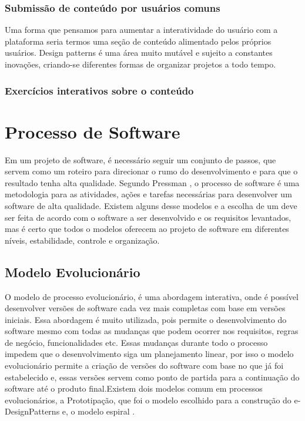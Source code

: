 \subsubsection{Submissão de conteúdo por usuários comuns}
Uma forma que pensamos para aumentar a interatividade do usuário com a plataforma seria termos uma seção de conteúdo alimentado pelos próprios usuários. Design patterns é uma área muito mutável e sujeito a constantes inovações, criando-se diferentes formas de organizar projetos a todo tempo. 
\subsubsection{Exercícios interativos sobre o conteúdo}

\section{Processo de Software}

Em um projeto de software, é necessário seguir um conjunto de passos, que servem como um roteiro para direcionar o rumo do desenvolvimento e para que o resultado tenha alta qualidade. Segundo Pressman \cite{pressman2016engenharia}, o processo de software é uma metodologia para as atividades, ações e tarefas necessárias para desenvolver um software de alta qualidade. Existem alguns desse modelos e a escolha de um deve ser feita de acordo com o software a ser desenvolvido e os requisitos levantados, mas é certo que todos o modelos oferecem ao projeto de software em diferentes níveis, estabilidade, controle e organização.

\subsection{Modelo Evolucionário} 

O modelo de processo evolucionário, é uma abordagem interativa, onde é possível desenvolver versões de software cada vez mais completas com base em versões iniciais. Essa abordagem é muito utilizada, pois permite o desenvolvimento do software  mesmo com todas as mudanças que podem ocorrer nos requisitos, regras de negócio, funcionalidades etc. Essas mudanças durante todo o processo impedem que o desenvolvimento siga um planejamento linear, por isso o modelo evolucionário permite a criação de versões do software com base no que já foi estabelecido e, essas versões servem como ponto de partida para a continuação do software até o produto final.Existem dois modelos comum em processos evolucionários, a Prototipação, que foi o modelo escolhido para a construção do e-DesignPatterns e, o modelo espiral \cite{pressman2016engenharia}. 


